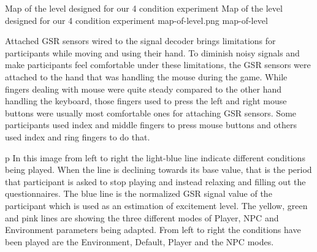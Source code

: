\documentclass[conference]{IEEEtran}
\begin{document}
\img
{Map of the level designed for our 4 condition experiment}
{Map of the level designed for our 4 condition experiment}
{map-of-level.png}
{map-of-level}

Attached GSR sensors wired to the signal decoder brings limitations for participants while moving and using their hand. To diminish noisy signals and make participants feel comfortable under these limitations, the GSR sensors were attached to the hand that was handling the mouse during the game. While fingers dealing with mouse were quite steady compared to the other hand handling the keyboard, those fingers used to press the left and right mouse buttons were usually most comfortable ones for attaching GSR sensors. Some participants used index and middle fingers to press mouse buttons and others used index and ring fingers to do that.

p In this image from left to right the light-blue line
indicate different conditions being played. When the line is declining towards its base value, that is the period that participant is asked to stop playing and instead relaxing and filling out the questionnaires. The blue line is the normalized GSR signal value of the participant which is used as an estimation of excitement level. The yellow, green and pink lines are showing the three different modes of Player, NPC and Environment parameters being adapted. From left to right the conditions have been played are the Environment, Default, Player and the NPC modes.
\end{document}
